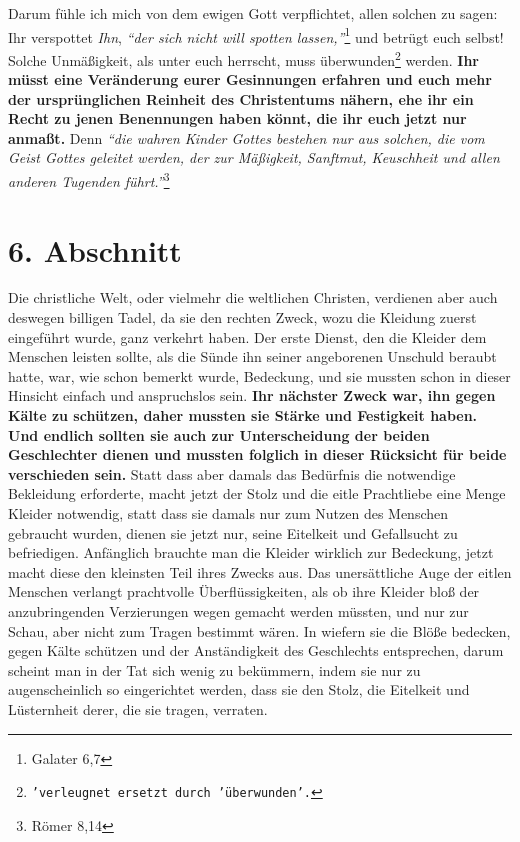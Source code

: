 \medskip

Darum fühle ich mich von dem ewigen Gott verpflichtet, allen solchen zu sagen:
Ihr verspottet \textit{Ihn},
\textit{"`der sich nicht will spotten lassen,"'}\footnote{Galater 6,7}
und betrügt euch selbst! Solche Unmäßigkeit, als unter
euch herrscht, muss
überwunden\footnote{\texttt{'verleugnet ersetzt durch 'überwunden'.}} werden.
\label{ref:14_06_wahre_nachfolger_umkehr}
\textbf{Ihr müsst eine Veränderung eurer Gesinnungen erfahren und euch
mehr der ursprünglichen Reinheit des Christentums nähern, ehe ihr ein Recht zu
jenen Benennungen haben könnt, die ihr euch jetzt nur anmaßt.}
 Denn
\textit{"`die wahren
Kinder Gottes bestehen nur aus solchen, die vom Geist Gottes geleitet werden,
der zur Mäßigkeit, Sanftmut, Keuschheit und allen anderen Tugenden
führt."'}\footnote{Römer 8,14}

\section{6. Abschnitt} \label{kap14_ab6}

Die christliche Welt, oder vielmehr die weltlichen
Christen,
verdienen aber auch
deswegen billigen Tadel, da sie den rechten Zweck, wozu die Kleidung zuerst
eingeführt wurde, ganz verkehrt haben. Der erste Dienst, den die Kleider dem
Menschen leisten sollte, als die Sünde ihn seiner angeborenen Unschuld beraubt
hatte, war, wie schon bemerkt wurde, Bedeckung, und sie mussten schon in dieser
Hinsicht einfach und anspruchslos sein. \textbf{Ihr nächster Zweck war, ihn
gegen Kälte
zu schützen, daher mussten sie Stärke und Festigkeit haben. Und endlich sollten
sie auch zur Unterscheidung der beiden Geschlechter dienen und mussten folglich
in dieser Rücksicht für beide verschieden sein.} Statt dass aber
damals das
Bedürfnis die notwendige Bekleidung erforderte, macht jetzt der Stolz und die
eitle Prachtliebe eine Menge Kleider notwendig, statt dass sie damals nur zum
Nutzen des Menschen gebraucht wurden, dienen sie jetzt nur, seine
Eitelkeit und
Gefallsucht zu befriedigen. Anfänglich brauchte man die Kleider wirklich zur
Bedeckung, jetzt macht diese den kleinsten Teil ihres Zwecks aus. Das
unersättliche Auge der eitlen Menschen verlangt prachtvolle Überflüssigkeiten,
als ob ihre Kleider bloß der anzubringenden Verzierungen wegen gemacht werden
müssten, und nur zur Schau, aber nicht zum Tragen bestimmt wären. In wiefern sie
die Blöße bedecken, gegen Kälte schützen und der Anständigkeit des Geschlechts
entsprechen, darum scheint man in der Tat sich wenig zu bekümmern, indem
sie nur zu augenscheinlich so eingerichtet werden, dass sie den Stolz, die
Eitelkeit und Lüsternheit derer, die sie tragen, verraten.


